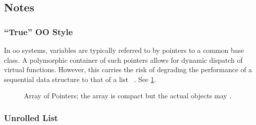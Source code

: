 \subsection{Notes}

\subsubsection{``True'' OO Style}

%


In \gls{oo} systems, variables are typically referred to by pointers to a common base
class.  A polymorphic container of such pointers allows for dynamic dispatch of virtual
functions.  However, this carries the risk of degrading the  performance of a
sequential data structure to that of a list%
~\cite[51:22]{stroustrup-talk}.
See \cref{fig:true-oo}.

\begin{figure}
   \centering
   
   \captionsetup{width=.9\linewidth} %
   \caption[Array of Pointers]{Array of Pointers; the array is compact but the actual
   objects may .}
   \label{fig:true-oo}
\end{figure}

\subsubsection{Unrolled List}


